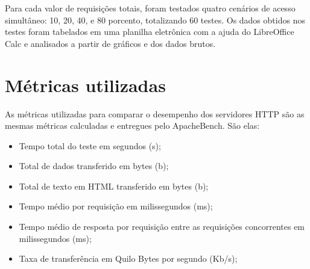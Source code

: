 Para cada valor de requisições totais, foram testados quatro cenários de acesso 
simultâneo: 10, 20, 40, e 80 porcento, totalizando 60 testes. Os dados obtidos 
nos testes foram tabelados em uma planilha eletrônica com a ajuda do 
LibreOffice Calc e analisados a partir de gráficos e dos dados brutos.

\section{Métricas utilizadas}

As métricas utilizadas para comparar o desempenho dos servidores HTTP são as 
mesmas métricas calculadas e entregues pelo ApacheBench. São elas:

\begin{itemize}
	\item Tempo total do teste em segundos (s);
	\item Total de dados transferido em bytes (b);
	\item Total de texto em HTML transferido em bytes (b);
	\item Tempo médio por requisição em milissegundos (ms);
	\item Tempo médio de resposta por requisição entre as requisições 
	concorrentes em milissegundos (ms);
	\item Taxa de transferência em Quilo Bytes por segundo (Kb/s);
\end{itemize}
